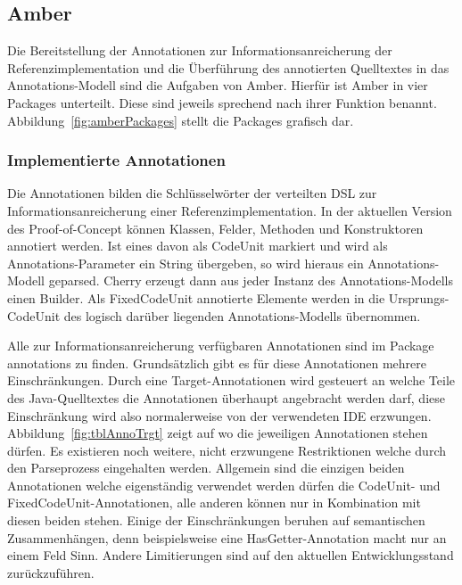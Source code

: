 \documentclass[12pt,oneside,a4paper,parskip]{scrbook}
\begin{document}
\subsection{Amber}

Die Bereitstellung der Annotationen zur Informationsanreicherung der Referenzimplementation und die Überführung des annotierten Quelltextes in das Annotations-Modell sind die Aufgaben von Amber. Hierfür ist Amber in vier Packages unterteilt. Diese sind jeweils sprechend nach ihrer Funktion benannt. Abbildung~\ref{fig:amberPackages} stellt die Packages grafisch dar.

\subsubsection{Implementierte Annotationen}

Die Annotationen bilden die Schlüsselwörter der verteilten DSL zur Informationsanreicherung einer Referenzimplementation. In der aktuellen Version des Proof-of-Concept können Klassen, Felder, Methoden und Konstruktoren annotiert werden. Ist eines davon als CodeUnit markiert und wird als Annotations-Parameter ein String übergeben, so wird hieraus ein Annotations-Modell geparsed. Cherry erzeugt dann aus jeder Instanz des Annotations-Modells einen Builder. Als FixedCodeUnit annotierte Elemente werden in die Ursprungs-CodeUnit des logisch darüber liegenden Annotations-Modells übernommen.

Alle zur Informationsanreicherung verfügbaren Annotationen sind im Package annotations zu finden. Grundsätzlich gibt es für diese Annotationen mehrere Einschränkungen. Durch eine Target-Annotationen wird gesteuert an welche Teile des Java-Quelltextes die Annotationen überhaupt angebracht werden darf, diese Einschränkung wird also normalerweise von der verwendeten IDE erzwungen. Abbildung~\ref{fig:tblAnnoTrgt} zeigt auf wo die jeweiligen Annotationen stehen dürfen. Es existieren noch weitere, nicht erzwungene Restriktionen welche durch den Parseprozess eingehalten werden. Allgemein sind die einzigen beiden Annotationen welche eigenständig verwendet werden dürfen die CodeUnit- und FixedCodeUnit-Annotationen, alle anderen können nur in Kombination mit diesen beiden stehen. Einige der Einschränkungen beruhen auf semantischen Zusammenhängen, denn beispielsweise eine HasGetter-Annotation macht nur an einem Feld Sinn. Andere Limitierungen sind auf den aktuellen Entwicklungsstand zurückzuführen.
\end{document}
